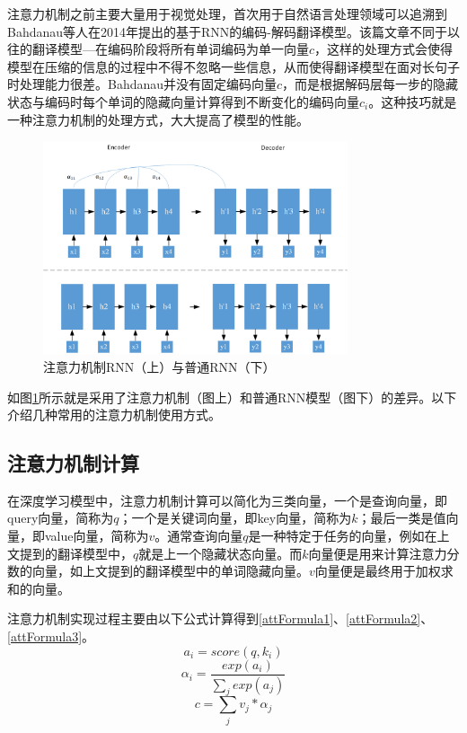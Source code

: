 注意力机制之前主要大量用于视觉处理，首次用于自然语言处理领域可以追溯到Bahdanau等人在2014年提出的基于RNN的编码-解码翻译模型。该篇文章不同于以往的翻译模型—在编码阶段将所有单词编码为单一向量$c$，这样的处理方式会使得模型在压缩的信息的过程中不得不忽略一些信息，从而使得翻译模型在面对长句子时处理能力很差。Bahdanau并没有固定编码向量$c$，而是根据解码层每一步的隐藏状态与编码时每个单词的隐藏向量计算得到不断变化的编码向量$c_i$。这种技巧就是一种注意力机制的处理方式，大大提高了模型的性能。
\begin{figure}[htb]%
	\setlength{\belowcaptionskip}{0pt}
	\centering
	\includegraphics[width=0.8\textwidth]{pic/2-10.png}
	\caption{注意力机制RNN（上）与普通RNN（下）}
	\label{rnn-att}
\end{figure}

如图\ref{rnn-att}所示就是采用了注意力机制（图上）和普通RNN模型（图下）的差异。以下介绍几种常用的注意力机制使用方式。
\subsection{注意力机制计算}
在深度学习模型中，注意力机制计算可以简化为三类向量，一个是查询向量，即query向量，简称为$q$；一个是关键词向量，即key向量，简称为$k$；最后一类是值向量，即value向量，简称为$v$。通常查询向量$q$是一种特定于任务的向量，例如在上文提到的翻译模型中，$q$就是上一个隐藏状态向量。而$k$向量便是用来计算注意力分数的向量，如上文提到的翻译模型中的单词隐藏向量。$v$向量便是最终用于加权求和的向量。

注意力机制实现过程主要由以下公式计算得到\ref{attFormula1}、\ref{attFormula2}、\ref{attFormula3}。
\begin{equation}\label{attFormula1}
	a_i = score(q,k_i)
\end{equation}
\begin{equation}\label{attFormula2}
	\alpha_i = \frac{exp(a_i)}{\sum_{j}exp(a_j)}
\end{equation}
\begin{equation}\label{attFormula3}
	c=\sum_{j}v_j* \alpha_j
\end{equation}


